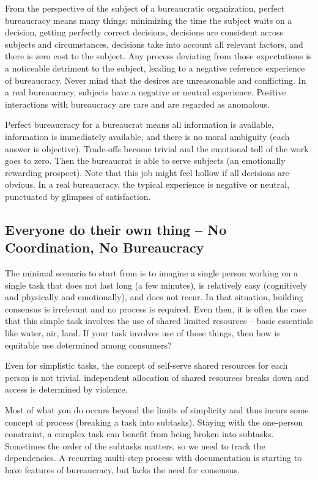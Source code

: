 From the perspective of the subject of a bureaucratic organization, perfect bureaucracy means many things: minimizing the time the subject waits on a decision, getting perfectly correct decisions, decisions are consistent across subjects and circumstances, decisions take into account all relevant factors, and there is zero cost to the subject. Any process deviating from those expectations is a noticeable detriment to the subject, leading to a negative reference experience of bureaucracy. Never mind that the desires are unreasonable and conflicting. In a real bureaucracy, subjects have a negative or neutral experience. Positive interactions with bureaucracy are rare and are regarded as anomalous.

Perfect bureaucracy for a bureaucrat means all information is available, information is immediately available, and there is no moral ambiguity (each answer is objective). Trade-offs become trivial and the emotional toll of the work goes to zero. Then the bureaucrat is able to serve subjects (an emotionally rewarding prospect). Note that this job might feel hollow if all decisions are obvious. In a real bureaucracy, the typical experience is negative or neutral, punctuated by glimpses of satisfaction. 

\subsection{Everyone do their own thing -- No Coordination, No Bureaucracy}
The minimal scenario to start from is to imagine a single person working on a single task that does not last long (a few minutes), is relatively easy (cognitively and physically and emotionally), and does not recur. In that situation, building consensus is irrelevant and no process is required. Even then, it is often the case that this simple task involves the use of shared limited resources -- basic essentials like water, air, land. If your task involves use of those things, then how is equitable use determined among consumers?

Even for simplistic tasks, the concept of self-serve shared resources for each person is not trivial. independent allocation of shared resources breaks down and access is determined by violence.

Most of what you do occurs beyond the limits of simplicity and thus incurs some concept of \gls{process} (breaking a task into subtasks). Staying with the one-person constraint, a complex task can benefit from being broken into subtasks. Sometimes the order of the subtasks matters, so we need to track the dependencies. A recurring multi-step process with documentation is starting to have features of bureaucracy, but lacks the need for consensus. 


